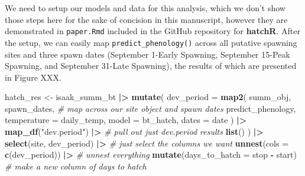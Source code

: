 \documentclass[10pt,a4paper,onecolumn]{article}
\newenvironment{Shaded}{\begin{snugshade}}{\end{snugshade}}
\newcommand{\AttributeTok}[1]{\textcolor[rgb]{0.13,0.29,0.53}{#1}}
\newcommand{\CommentTok}[1]{\textcolor[rgb]{0.56,0.35,0.01}{\textit{#1}}}
\newcommand{\FunctionTok}[1]{\textcolor[rgb]{0.13,0.29,0.53}{\textbf{#1}}}
\newcommand{\NormalTok}[1]{#1}
\newcommand{\OtherTok}[1]{\textcolor[rgb]{0.56,0.35,0.01}{#1}}
\newcommand{\SpecialCharTok}[1]{\textcolor[rgb]{0.81,0.36,0.00}{\textbf{#1}}}
\newcommand{\StringTok}[1]{\textcolor[rgb]{0.31,0.60,0.02}{#1}}
\begin{document}
We need to setup our models and data for this analysis, which we don't
show those steps here for the sake of concision in this manuscript,
however they are demonstrated in \texttt{paper.Rmd} included in the
GitHub repository for \textbf{hatchR}. After the setup, we can easily
map \texttt{predict\_phenology()} across all putative spawning sites and
three spawn dates (September 1-Early Spawning, September 15-Peak
Spawning, and September 31-Late Spawning), the results of which are
presented in Figure XXX.

\begin{Shaded}
\begin{Highlighting}[]
\NormalTok{hatch\_res }\OtherTok{\textless{}{-}}\NormalTok{ isaak\_summ\_bt }\SpecialCharTok{|\textgreater{}} 
  \FunctionTok{mutate}\NormalTok{(}
    \AttributeTok{dev\_period =} \FunctionTok{map2}\NormalTok{(}
\NormalTok{      summ\_obj, spawn\_dates, }\CommentTok{\# map across our site object and spawn dates}
\NormalTok{      predict\_phenology,}
      \AttributeTok{temperature =}\NormalTok{ daily\_temp,}
      \AttributeTok{model =}\NormalTok{ bt\_hatch,}
      \AttributeTok{dates =}\NormalTok{ date}
\NormalTok{      ) }\SpecialCharTok{|\textgreater{}} 
      \FunctionTok{map\_df}\NormalTok{(}\StringTok{"dev.period"}\NormalTok{) }\SpecialCharTok{|\textgreater{}} \CommentTok{\# pull out just dev.period results}
      \FunctionTok{list}\NormalTok{()}
\NormalTok{    ) }\SpecialCharTok{|\textgreater{}} 
  \FunctionTok{select}\NormalTok{(site, dev\_period) }\SpecialCharTok{|\textgreater{}} \CommentTok{\# just select the columns we want}
  \FunctionTok{unnest}\NormalTok{(}\AttributeTok{cols =} \FunctionTok{c}\NormalTok{(dev\_period)) }\SpecialCharTok{|\textgreater{}} \CommentTok{\# unnest everything}
  \FunctionTok{mutate}\NormalTok{(}\AttributeTok{days\_to\_hatch =}\NormalTok{ stop }\SpecialCharTok{{-}}\NormalTok{ start) }\CommentTok{\# make a new column of days to hatch}
\end{Highlighting}
\end{Shaded}
\end{document}
